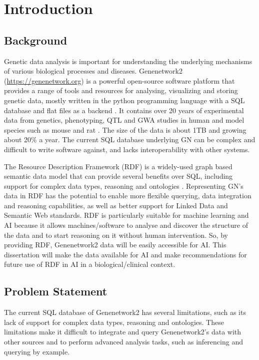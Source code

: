 \chapter{Introduction}

\section{Background}
Genetic data analysis is important for understanding the underlying mechanisms of various biological processes and diseases.  Genenetwork2 (\url{https://genenetwork.org}) is a powerful open-source software platform that provides a range of tools and resources for analysing, visualizing and storing genetic data, mostly written in the python programming language with a SQL database and flat files as a backend \citetext{\citealp{sloan2016genenetwork}; \citealp*{mulligan2017genenetwork}}.  It contains over 20 years of experimental data from genetics, phenotyping, QTL and GWA studies in human and model species such as mouse and rat \citep{sloan2016genenetwork}.  The size of the data is about 1TB and growing about 20\% a year.  The current SQL database underlying GN can be complex and difficult to write software against, and lacks interoperability with other systems.

The Resource Description Framework (RDF) is a widely-used graph based semantic data model that can provide several benefits over SQL, including support for complex data types, reasoning and ontologies \citep*{candan2001resource,allemang2011semantic}.  Representing GN's data in RDF has the potential to enable more flexible querying, data integration and reasoning capabilities, as well as better support for Linked Data and Semantic Web standards.  RDF is particularly suitable for machine learning and AI because it allows machines/software to analyse and discover the structure of the data and to start reasoning on it without human intervention.  So, by providing RDF, Genenetwork2 data will be easily accessible for AI.  This dissertation will make the data available for AI and make recommendations for future use of RDF in AI in a biological/clinical context.

\section{Problem Statement}

The current SQL database of Genenetwork2 has several limitations, such as its lack of support for complex data types, reasoning and ontologies.  These limitations make it difficult to integrate and query Genenetwork2's data with other sources and to perform advanced analysis tasks, such as inferencing and querying by example.

